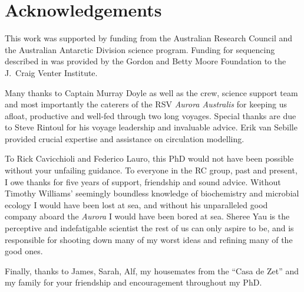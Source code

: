 \chapter*{Acknowledgements} 

This work was supported by funding from the Australian Research Council and the Australian Antarctic Division science program.
Funding for sequencing described in  was provided by the Gordon and Betty Moore Foundation to the J.\ Craig Venter Institute.

Many thanks to Captain Murray Doyle as well as the crew, science support team and most importantly the caterers of the RSV \textit{Aurora Australis} for keeping us afloat, productive and well-fed through two long voyages.
Special thanks are due to Steve Rintoul for his voyage leadership and invaluable advice.
Erik van Sebille provided crucial expertise and assistance on circulation modelling.

To Rick Cavicchioli and Federico Lauro, this PhD would not have been possible without your unfailing guidance.
To everyone in the RC group, past and present, I owe thanks for five years of support, friendship and sound advice.
Without Timothy Williams' seemingly boundless knowledge of biochemistry and microbial ecology I would have been lost at sea, and without his unparalleled good company aboard the \textit{Aurora} I would have been bored at sea.
Sheree Yau is the perceptive and indefatigable scientist the rest of us can only aspire to be, and is responsible for shooting down many of my worst ideas and refining many of the good ones.

Finally, thanks to James, Sarah, Alf, my housemates from the ``Casa de Zet'' and my family for your friendship and encouragement throughout my PhD.
